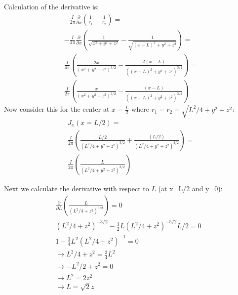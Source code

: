     \begin{tcolorbox}[enhanced jigsaw,breakable,pad at break*=1mm,
    colback=blue!5!white,colframe=babyblueeyes,title=Solutions,
    watermark color=white]
   
   
 
      Calculation of the derivative is:
      \begin{eqnarray*}
        &-\frac{I}{2\pi} \frac{\partial }{\partial x} \left(\frac{1}{r_1} - \frac{1}{r_2}\right) =  \\
        &-\frac{I}{2\pi} \frac{\partial }{\partial x} \left(\frac{1}{\sqrt{x^2+y^2+z^2}} - \frac{1}{\sqrt{(x-L)^2+y^2+z^2}}\right)= \\
        &\frac{I}{4\pi}  \left(\frac{2x}{(x^2+y^2+z^2)^{3/2}} - \frac{2(x-L)}{((x-L)^2+y^2+z^2)^{3/2}}\right)= \\
        &\frac{I}{2\pi}  \left(\frac{x}{(x^2+y^2+z^2)^{3/2}} - \frac{(x-L)}{((x-L)^2+y^2+z^2)^{3/2}}\right)
     \end{eqnarray*}
     Now consider this for the center at $x=\frac{L}{2}$ where $r_1 = r_2 = \sqrt{L^2/4+y^2+z^2}$:
     \begin{eqnarray*}
      &J_x(x=L/2) =   \\
      & \frac{I}{2\pi}\left(\frac{L/2}{(L^2/4+y^2+z^2)^{3/2}} + \frac{(L/2)}{(L^2/4+y^2+z^2)^{3/2}}\right) = \\
      &\frac{I}{2\pi}  \left(\frac{L}{(L^2/4+y^2+z^2)^{3/2}}\right)
     \end{eqnarray*}
     \begin{center}
\end{center}
Next we calculate the derivative with respect to $L$ (at x=L/2 and y=0):
\begin{eqnarray*}
  \frac{\partial}{\partial L}\left(\frac{L}{(L^2/4+z^2)^{3/2}}\right) = 0 \\
  (L^2/4+z^2)^{-3/2} -\frac{3}{2}L (L^2/4+z^2)^{-5/2}L/2 = 0 \\
  1 -\frac{3}{4}L^2 (L^2/4+z^2)^{-1} = 0 \\
  \rightarrow L^2/4+z^2 = \frac{3}{4}L^2 \\
  \rightarrow -L^2/2+z^2 = 0 \\
  \rightarrow L^2 = 2 z^2 \\
  \rightarrow L = \sqrt{2} z \\
\end{eqnarray*}


\end{tcolorbox}
